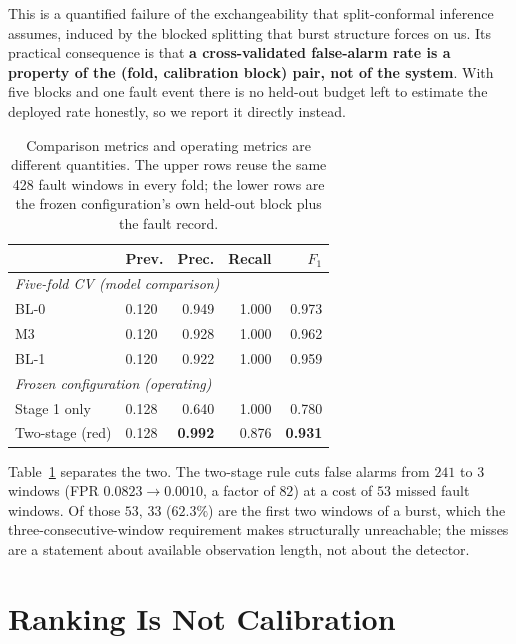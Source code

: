 \documentclass{article}
\begin{document}
This is a quantified failure of the exchangeability that split-conformal
inference assumes, induced by the blocked splitting that burst structure forces
on us. Its practical consequence is that \textbf{a cross-validated false-alarm
rate is a property of the (fold, calibration block) pair, not of the system}.
With five blocks and one fault event there is no held-out budget left to
estimate the deployed rate honestly, so we report it directly instead.

\begin{table}[t]
\caption{Comparison metrics and operating metrics are different quantities.
The upper rows reuse the same 428 fault windows in every fold; the lower rows
are the frozen configuration's own held-out block plus the fault record.}
\label{tab:operational}
\vskip 0.08in
\centering
\small
\setlength{\tabcolsep}{3.5pt}
\begin{tabular}{llrrr}
\toprule
 & Prev. & Prec. & Recall & $F_1$ \\
\midrule
\multicolumn{5}{l}{\textit{Five-fold CV (model comparison)}} \\
\quad BL-0 & 0.120 & 0.949 & 1.000 & 0.973 \\
\quad M3   & 0.120 & 0.928 & 1.000 & 0.962 \\
\quad BL-1 & 0.120 & 0.922 & 1.000 & 0.959 \\
\midrule
\multicolumn{5}{l}{\textit{Frozen configuration (operating)}} \\
\quad Stage 1 only & 0.128 & 0.640 & 1.000 & 0.780 \\
\quad Two-stage (red) & 0.128 & \textbf{0.992} & 0.876 & \textbf{0.931} \\
\bottomrule
\end{tabular}
\end{table}

Table~\ref{tab:operational} separates the two. The two-stage rule cuts false
alarms from $241$ to $3$ windows (FPR $0.0823 \rightarrow 0.0010$, a factor of
$82$) at a cost of $53$ missed fault windows. Of those $53$, $33$ ($62.3\%$)
are the first two windows of a burst, which the three-consecutive-window
requirement makes structurally unreachable; the misses are a statement about
available observation length, not about the detector.

\section{Ranking Is Not Calibration}
\label{sec:prob}
\end{document}
